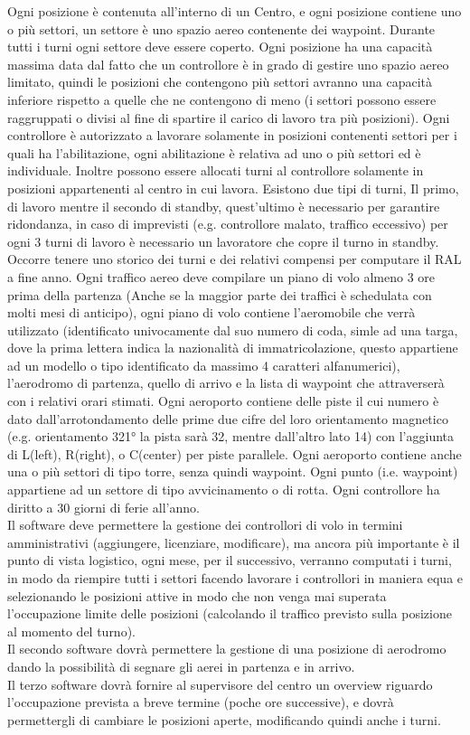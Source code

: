 Ogni posizione è contenuta all'interno di un Centro, e ogni posizione contiene uno o più settori, un settore è uno spazio aereo contenente dei waypoint. Durante tutti i turni ogni settore deve essere coperto. 
Ogni posizione ha una capacità massima data dal fatto che un controllore è in grado di gestire uno spazio aereo limitato, quindi le posizioni che contengono più settori avranno una capacità inferiore rispetto a quelle che ne contengono di meno (i settori possono essere raggruppati o divisi al fine di spartire il carico di lavoro tra più posizioni).
Ogni controllore è autorizzato a lavorare solamente in posizioni contenenti settori per i quali ha l’abilitazione, ogni abilitazione è relativa ad uno o più settori ed è individuale. Inoltre possono essere allocati turni al controllore solamente in posizioni appartenenti al centro in cui lavora.
Esistono due tipi di turni, Il primo, di lavoro mentre il secondo di standby, quest'ultimo è necessario per garantire ridondanza, in caso di imprevisti (e.g. controllore malato, traffico eccessivo)
per ogni 3 turni di lavoro è necessario un lavoratore che copre il turno in standby. Occorre tenere uno storico dei turni e dei relativi compensi per computare il RAL a fine anno.
Ogni traffico aereo deve compilare un piano di volo almeno 3 ore prima della partenza (Anche se la maggior parte dei traffici è schedulata con molti mesi di anticipo), ogni piano di volo contiene l'aeromobile che verrà utilizzato (identificato univocamente dal suo numero di coda, simle ad una targa, dove la prima lettera indica la nazionalità di immatricolazione, questo appartiene ad un modello o tipo identificato da massimo 4 caratteri alfanumerici), l'aerodromo di partenza, quello di arrivo e la lista di waypoint che attraverserà con i relativi orari stimati. Ogni aeroporto contiene delle piste il cui numero è dato dall'arrotondamento delle prime due cifre del loro orientamento magnetico (e.g. orientamento 321° la pista sarà 32, mentre dall'altro lato 14) con l'aggiunta di L(left), R(right), o C(center) per piste parallele. Ogni aeroporto contiene anche una o più settori di tipo torre, senza quindi waypoint. 
Ogni punto (i.e. waypoint) appartiene ad un settore di tipo avvicinamento o di rotta.
Ogni controllore ha diritto a 30 giorni di ferie all'anno.\\
Il software deve permettere la gestione dei controllori di volo in termini amministrativi (aggiungere, licenziare, modificare), 
ma ancora più importante è il punto di vista logistico, ogni mese, per il successivo, verranno computati i turni, in modo da riempire tutti i settori facendo lavorare i controllori in maniera equa e selezionando le posizioni attive in modo che non venga mai superata l'occupazione limite delle posizioni (calcolando il traffico previsto sulla posizione al momento del turno).\\
Il secondo software dovrà permettere la gestione di una posizione di aerodromo dando la possibilità di segnare gli aerei in partenza e in arrivo.\\
Il terzo software dovrà fornire al supervisore del centro un overview riguardo l'occupazione prevista a breve termine (poche ore successive), e dovrà permettergli di cambiare le posizioni aperte, modificando quindi anche i turni.\\
